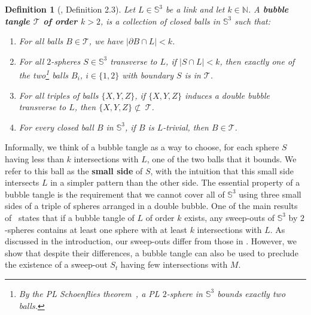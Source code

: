 \documentclass{article}
\newcommand{\Sp}{\mathbb{S}}
\newcommand{\T}{\mathcal{T}}
\newtheorem{definition}[theorem]{Definition}
\begin{document}
\begin{definition}[\cite{Lunel_spherewidth_out}, Definition 2.3]
\label{def:bubbletangle}
Let $L \in \Sp^3$ be a link and let $k \in \mathbb{N}$. A \textbf{bubble tangle $\T$ of order $k > 2$}, is a collection of closed balls in $\Sp^3$ such that: 
\begin{enumerate}[label = (T\arabic*)]
	\item \label{def_T1} For all balls $B \in \mathcal{T}$, we have $|\partial B \cap L| < k$.
	\item \label{def_T2} For all $2$-spheres $S \in \Sp^3$ transverse to $L$, if $|S \cap L| < k$, then exactly one of the two\footnote{By the PL Schoenflies theorem~\cite[Theorem~XIV.1]{bing}, a PL $2$-sphere in $\Sp^3$ bounds exactly two balls.} balls $B_i$, $i \in \{1, 2\}$ with boundary $S$ is in $\T$. 
	\item \label{def_T3} For all triples of balls $\{ X,Y,Z \}$, if $\{ X,Y,Z \}$ induces a double bubble transverse to $L$, then $\{ X,Y,Z \} \not \subset~\T$.  
	\item \label{def_T4} For every closed ball $B$ in $\Sp^3$, if $B$ is $L$-trivial, then $B \in \T$.
\end{enumerate}
\end{definition}

Informally, we think of a bubble tangle as a way to choose, for each sphere $S$ having less than $k$ intersections with $L$, one of the two balls that it bounds. We refer to this ball as the \textbf{small side} of $S$, with the intuition that this small side intersects $L$ in a simpler pattern than the other side. The essential property of a bubble tangle is the requirement that we cannot cover all of $\Sp^3$ using three small sides of a triple of spheres arranged in a double bubble. One of the main results of~\cite{Lunel_spherewidth_out} states that if a bubble tangle of $L$ of order $k$ exists, any sweep-outs of $\Sp^3$ by $2$-spheres contains at least one sphere with at least $k$ intersections with $L$. As discussed in the introduction, our sweep-outs differ from those in \cite{Lunel_spherewidth_out}. However, we show that despite their differences, a bubble tangle can also be used to preclude the existence of a sweep-out $S_t$ having few intersections with $M$.
\end{document}
